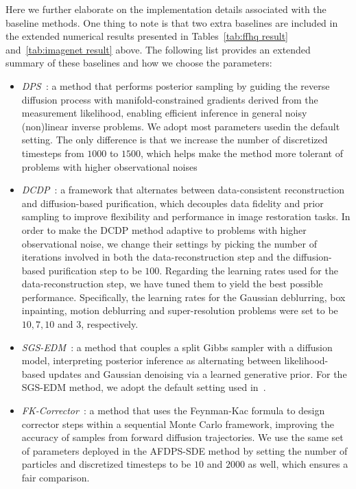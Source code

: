 \documentclass{article}
\numberwithin{equation}{section}
\begin{document}
Here we further elaborate on the implementation details associated with the baseline methods. One thing to note is that two extra baselines are included in the extended numerical results presented in Tables~\ref{tab:ffhq result} and~\ref{tab:imagenet result} above. The following list provides an extended summary of these baselines and how we choose the parameters:
\begin{itemize}

    \item \emph{DPS~\cite{chung2022diffusion}}: a method that performs posterior sampling by guiding the reverse diffusion process with manifold-constrained gradients derived from the measurement likelihood, enabling efficient inference in general noisy (non)linear inverse problems. We adopt most parameters usedin the default setting. The only difference is that we increase the number of discretized timesteps from $1000$ to $1500$, which helps make the method more tolerant of problems with higher observational noises
    
    \item \emph{DCDP~\cite{li2024decoupled}}: a framework that alternates between data-consistent reconstruction and diffusion-based purification, which decouples data fidelity and prior sampling to improve flexibility and performance in image restoration tasks. In order to make the DCDP method adaptive to problems with higher observational noise, we change their settings by picking the number of iterations involved in both the data-reconstruction step and the diffusion-based purification step to be $100$. Regarding the learning rates used for the data-reconstruction step, we have tuned them to yield the best possible performance. Specifically, the learning rates for the Gaussian deblurring, box inpainting, motion deblurring and super-resolution problems were set to be $10,7,10$ and $3$, respectively. 
    
    \item \emph{SGS-EDM~\cite{wu2024principled}}: a method that couples a split Gibbs sampler with a diffusion model, interpreting posterior inference as alternating between likelihood-based updates and Gaussian denoising via a learned generative prior. For the SGS-EDM method, we adopt the default setting used in~\cite{wu2024principled}.
    
    \item \emph{FK-Corrector~\cite{skreta2025feynman}}: a method that uses the Feynman-Kac formula to design corrector steps within a sequential Monte Carlo framework, improving the accuracy of samples from forward diffusion trajectories. We use the same set of parameters deployed in the AFDPS-SDE method by setting the number of particles and discretized timesteps to be $10$ and $2000$ as well, which ensures a fair comparison. 
    

\end{itemize}
\end{document}
